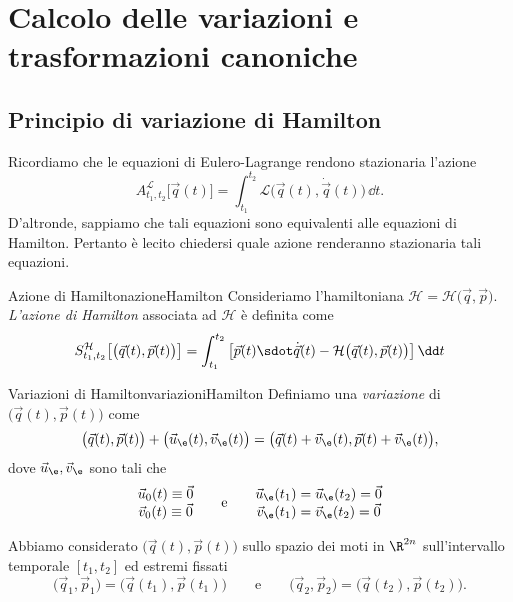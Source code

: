 \chapter{Calcolo delle variazioni e trasformazioni canoniche}
%
%
\section{Principio di variazione di Hamilton}

Ricordiamo che le equazioni di Eulero-Lagrange rendono stazionaria l'azione
\[
	A_{t_1,t_2}^{\mathcal{L}}\big[\vec{q}(t)\big] = \int_{t_1}^{t_2}\mathcal{L}\big(\vec{q}(t),\dot{\vec{q}}(t)\big)\,\dd t.
\]
D'altronde, sappiamo che tali equazioni sono equivalenti alle equazioni di Hamilton. Pertanto è lecito chiedersi quale azione renderanno stazionaria tali equazioni.

\begin{defn}{Azione di Hamilton}{azioneHamilton}
	Consideriamo l'hamiltoniana \(\mathcal{H}=\mathcal{H}\big(\vec{q},\vec{p}\big)\). \emph{L'azione di Hamilton} associata ad \(\mathcal{H}\) è definita come
	\[
		S_{t_1,t_2}^{\mathcal{H}}\big[\big(\vec{q}(t),\vec{p}(t)\big)\big] = \int_{t_1}^{t_2}\big[\vec{p}(t)\sdot \dot{\vec{q}}(t)-\mathcal{H}\big(\vec{q}(t),\vec{p}(t)\big)\big]\,\dd t
	\]
\end{defn}

\begin{defn}{Variazioni di Hamilton}{variazioniHamilton}
	Definiamo una \emph{variazione} di \(\big(\vec{q}(t),\vec{p}(t)\big)\) come
	\[
		\big(\vec{q}(t),\vec{p}(t)\big) + \big(\vec{u}_\e(t),\vec{v}_\e(t)\big) = \big(\vec{q}(t)+\vec{v}_\e(t),\vec{p}(t)+\vec{v}_\e(t)\big),
	\]
	dove \(\vec{u}_\e,\vec{v}_\e\) sono tali che
	\[
		\begin{matrix}
			\vec{u}_0(t) \equiv \vec{0} \\
			\vec{v}_0(t) \equiv \vec{0}
		\end{matrix} \qquad\text{e}\qquad
		\begin{matrix}
			\vec{u}_\e(t_1) = \vec{u}_\e(t_2) = \vec{0} \\
			\vec{v}_\e(t_1) = \vec{v}_\e(t_2) = \vec{0}
		\end{matrix}
	\]
\end{defn}

\begin{notz}
	Abbiamo considerato \(\big(\vec{q}(t),\vec{p}(t)\big)\) sullo spazio dei moti in \(\R^{2n}\) sull'intervallo temporale \([t_1,t_2]\) ed estremi fissati
	\[
		\big(\vec{q}_1,\vec{p}_1\big) = \big(\vec{q}(t_1),\vec{p}(t_1)\big) \qquad\text{e}\qquad \big(\vec{q}_2,\vec{p}_2\big) = \big(\vec{q}(t_2),\vec{p}(t_2)\big).
	\]
\end{notz}

